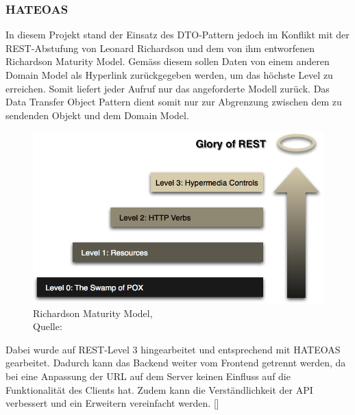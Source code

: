\subsubsection{\ac{HATEOAS}}
In diesem Projekt stand der Einsatz des DTO-Pattern jedoch im Konflikt mit der REST-Abstufung von Leonard Richardson und dem von ihm entworfenen Richardson Maturity Model. Gemäss diesem sollen Daten von einem anderen Domain Model als Hyperlink zurückgegeben werden, um das höchste Level zu erreichen. Somit liefert jeder Aufruf nur das angeforderte Modell zurück. Das Data Transfer Object Pattern dient somit nur zur Abgrenzung zwischen dem zu sendenden Objekt und dem Domain Model. 

\begin{figure}[H]
	\centering
	\includegraphics[scale=0.3]{images/richardsonMaturity.png}
	\caption[Richardson Maturity Model]{Richardson Maturity Model,\\ Quelle: \cite{richardsonMaturity}}
	\label{img: richardsonMaturity}
\end{figure}

Dabei wurde auf REST-Level 3 hingearbeitet und entsprechend mit HATEOAS gearbeitet. Dadurch kann das Backend weiter vom Frontend getrennt werden, da bei eine Anpassung der URL auf dem Server keinen Einfluss auf die Funktionalität des Clients hat. Zudem kann die Verständlichkeit der API verbessert und ein Erweitern vereinfacht werden. [\cite{richardsonMaturity}]

